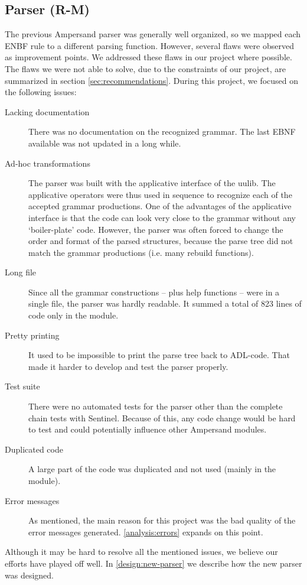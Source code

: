 
\subsection{Parser (R-M)}
\label{analysis:parser}
The previous Ampersand parser was generally well organized, so we mapped each ENBF rule to a different parsing function.
However, several flaws were observed as improvement points.
We addressed these flaws in our project where possible.
The flaws we were not able to solve, due to the constraints of our project, are summarized in section \autoref{sec:recommendations}.
During this project, we focused on the following issues:
\begin{description}
  \item[Lacking documentation]
    There was no documentation on the recognized grammar.
    The last EBNF available was not updated in a long while.
  
  \item[Ad-hoc transformations]
    The parser was built with the applicative interface of the uulib.
    The applicative operators were thus used in sequence to recognize each of the accepted grammar productions.
    One of the advantages of the applicative interface is that the code can look very close to the grammar without any `boiler-plate' code.
    However, the parser was often forced to change the order and format of the parsed structures, because the parse tree did not match the grammar productions (i.e. many rebuild functions).
    
  \item[Long file]
    Since all the grammar constructions -- plus help functions -- were in a single file, the parser was hardly readable.
    It summed a total of 823 lines of code only in the  module.
  
  \item[Pretty printing]
    It used to be impossible to print the parse tree back to ADL-code.
    That made it harder to develop and test the parser properly.
  
  \item[Test suite]
    There were no automated tests for the parser other than the complete chain tests with Sentinel.
    Because of this, any code change would be hard to test and could potentially influence other Ampersand modules.
  
  \item[Duplicated code]
    A large part of the code was duplicated and not used (mainly in the  module).
  
  \item[Error messages]
    As mentioned, the main reason for this project was the bad quality of the error messages generated.
    \autoref{analysis:errors} expands on this point.
\end{description}
%
Although it may be hard to resolve all the mentioned issues, we believe our efforts have played off well.
In \autoref{design:new-parser} we describe how the new parser was designed.

